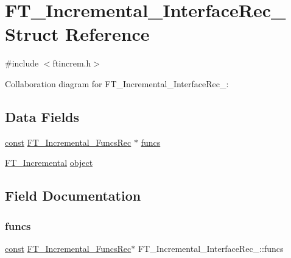 \hypertarget{struct_f_t___incremental___interface_rec__}{}\section{F\+T\+\_\+\+Incremental\+\_\+\+Interface\+Rec\+\_\+ Struct Reference}
\label{struct_f_t___incremental___interface_rec__}


{\ttfamily \#include $<$ftincrem.\+h$>$}



Collaboration diagram for F\+T\+\_\+\+Incremental\+\_\+\+Interface\+Rec\+\_\+\+:
\subsection*{Data Fields}
\begin{DoxyCompactItemize}
\item 
\hyperlink{zconf_8h_a2c212835823e3c54a8ab6d95c652660e}{const} \hyperlink{ftincrem_8h_ad771ba070b5075413589049634803c8e}{F\+T\+\_\+\+Incremental\+\_\+\+Funcs\+Rec} $\ast$ \hyperlink{struct_f_t___incremental___interface_rec___acd254ae2bdd80b4c9218a484c6bc2a41}{funcs}
\item 
\hyperlink{ftincrem_8h_a2ec8ac9cacdca1f493e4c3c5d27ed3c4}{F\+T\+\_\+\+Incremental} \hyperlink{struct_f_t___incremental___interface_rec___ae4f527f53465ff84ad01b484fe721a88}{object}
\end{DoxyCompactItemize}


\subsection{Field Documentation}
\mbox{\label{struct_f_t___incremental___interface_rec___acd254ae2bdd80b4c9218a484c6bc2a41}} 
\subsubsection{\texorpdfstring{funcs}{funcs}}
{\footnotesize\ttfamily \hyperlink{zconf_8h_a2c212835823e3c54a8ab6d95c652660e}{const} \hyperlink{ftincrem_8h_ad771ba070b5075413589049634803c8e}{F\+T\+\_\+\+Incremental\+\_\+\+Funcs\+Rec}$\ast$ F\+T\+\_\+\+Incremental\+\_\+\+Interface\+Rec\+\_\+\+::funcs}

